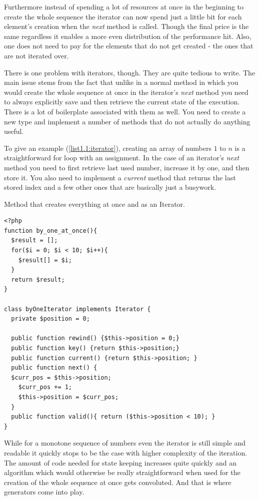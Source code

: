 Furthermore instead of spending a lot of resources at once in the beginning to create the whole sequence the iterator can now spend just a little bit for each element’s creation when the \emph{next} method is called. Though the final price is the same regardless it enables a more even distribution of the performance hit. Also, one does not need to pay for the elements that do not get created - the ones that are not iterated over.

There is one problem with iterators, though. They are quite tedious to write. The main issue stems from the fact that unlike in a normal method in which you would create the whole sequence at once in the iterator’s \emph{next} method you need to always explicitly save and then retrieve the current state of the execution. There is a lot of boilerplate associated with them as well. You need to create a new type and implement a number of methods that do not actually do anything useful.

To give an example (\autoref{list1.1:iterator}), creating an array of numbers $1$ to $n$ is a straightforward for loop with an assignment. In the case of an iterator’s \emph{next} method you need to first retrieve last used number, increase it by one, and then store it. You also need to implement a \emph{current} method that returns the last stored index and a few other ones that are basically just a busywork. 

\begin{listing}[H]
	\caption{Method that creates everything at once and as an Iterator.}
	\label{list1.1:iterator}
\begin{verbatim}
<?php
function by_one_at_once(){
  $result = [];
  for($i = 0; $i < 10; $i++){
    $result[] = $i;
  }
  return $result;
}

class byOneIterator implements Iterator {
  private $position = 0;

  public function rewind() {$this->position = 0;}
  public function key() {return $this->position;}
  public function current() {return $this->position; }
  public function next() {
  $curr_pos = $this->position;
    $curr_pos += 1;
    $this->position = $curr_pos;
  }
  public function valid(){ return ($this->position < 10); }
}
\end{verbatim}
\end{listing}

While for a monotone sequence of numbers even the iterator is still simple and readable it quickly stops to be the case with higher complexity of the iteration. The amount of code needed for state keeping increases quite quickly and an algorithm which would otherwise be really straightforward when used for the creation of the whole sequence at once gets convoluted. And that is where generators come into play.


